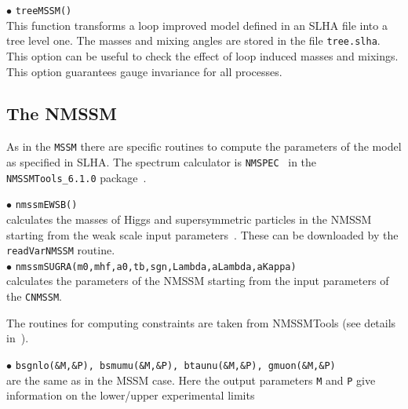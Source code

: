 \documentclass[12pt,a4paper]{article}
\begin{document}


\noi $\bullet$ \verb|treeMSSM()|\\
This function transforms a loop improved model defined in an SLHA file  into a tree level one. The masses and mixing angles are stored in the file
 {\tt tree.slha}. This option can be useful to check the effect of loop induced
masses and mixings. This option  guarantees gauge invariance for all processes.  


\subsection{The NMSSM}

As in the {\tt MSSM} there are specific routines to compute the  
parameters of the model as  specified in SLHA. The spectrum calculator is \verb|NMSPEC|~\cite{Ellwanger:2006rn}
 in the \verb|NMSSMTools_6.1.0| package~\cite{nmssmtools}.

\noindent$\bullet$ \verb|nmssmEWSB()|\\
calculates the masses of Higgs and supersymmetric particles in the NMSSM
starting from the weak scale input parameters~\cite{Ellwanger:2005dv}. These  can be downloaded by the 
{\tt readVarNMSSM} routine.\\   
\noindent$\bullet$ \verb|nmssmSUGRA(m0,mhf,a0,tb,sgn,Lambda,aLambda,aKappa)|\\
calculates the parameters of the NMSSM starting from the input parameters of 
the \verb|CNMSSM|.

The routines for computing constraints are taken from NMSSMTools (see details  in~\cite{Belanger:2006is}).

\noindent
$\bullet$ {\tt bsgnlo(\&M,\&P), bsmumu(\&M,\&P), btaunu(\&M,\&P),  gmuon(\&M,\&P)}\\ 
are the same as in the MSSM case.  Here the output parameters {\tt M} and {\tt P} 
give information on the lower/upper experimental limits~\cite{Domingo:2007dx}
\end{document}
